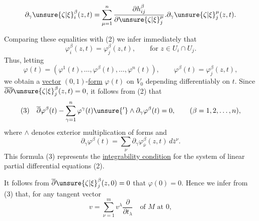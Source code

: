 
\[
\partial_\gamma\unsure{\zeta|\xi}_i^\beta(z,t)
=\sum_{\mu=1}^n\frac{\partial h_{ij}^\beta}{\partial\unsure{\zeta|\xi}_j^\mu}
.\partial_\gamma\unsure{\zeta|\xi}_j^\mu(z,t).
\]

Comparing these equalities with (2) we infer immediately that
\[
\varphi_i^\beta(z,t)=\varphi_j^\beta(z,t),\qquad\text{for }z\in U_i\cap U_j.
\]
Thus, letting
\[
\varphi(t)=(\varphi^1(t),\ldots,\varphi^\beta(t),\ldots,\varphi^n(t)),
\qquad\varphi^\beta(t)=\varphi_j^\beta(z,t),
\]
we obtain a \uline{vector} $(0,1)$-\uline{form} $\varphi(t)$ on $V_0$ depending
differentiably on $t$. Since $\overline\partial\overline\partial\unsure{\zeta|\xi}_j^\beta(z,t)=0$, it follows from
(2) that
\[
(3)\quad\overline\partial\varphi^\beta(t)
-\sum_{\gamma=1}^n\varphi^\gamma(t)\unsure{'}\wedge\partial_\gamma\varphi^\beta(t)=0,
\qquad(\beta=1,2,\ldots,n),
\]
where $\wedge$ denotes exterior multiplication of forms and
\[
\partial_\gamma\varphi^\beta(t)=\sum_\nu\partial_\gamma\varphi_{\bar\nu}^\beta(z,t)\,d\bar z^\nu.
\]
This formula (3) represents the \uline{integrability condition} for the
system of linear partial differential equations (2).

It follows from $\overline\partial\unsure{\zeta|\xi}_j^\beta(z,0)=0$ that $\varphi(0)=0$. Hence we
infer from (3) that, for any tangent vector
\[
v=\sum_{\nu=1}^m v^\lambda\frac{\partial}{\partial t_\lambda}\quad\text{of }M\text{ at }0,
\]

